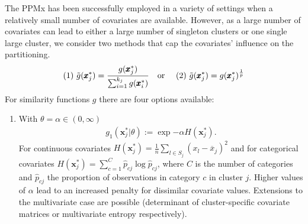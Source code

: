 \documentclass[12pt,a4paper]{article}
\begin{document}
The PPMx has been successfully employed in a variety
of settings when a relatively small number of covariates are
available.
However, as a large number of covariates can lead to either a large number of singleton clusters or one single large cluster, we consider two methods that cap the covariates' influence on the partitioning.
\begin{align*}
    (1) \ \Tilde{g} (\pmb{x}_j^*) = \frac{g (\pmb{x}_j^*)}{\sum_{i=1}^{k_j} g(\pmb{x}_i^*)} \ \text{\ \ or \ \ } \ (2) \ \Tilde{g} (\pmb{x}_j^*) = g (\pmb{x}_j^*)^{\frac{1}{p}}
\end{align*}
For similarity functions $g$ there are four options available:
\begin{enumerate}
 \item With $\theta = \alpha \in (0, \infty)$
    \begin{align*}
        g_1( \pmb{x}_j^* \vert \theta ) := \exp{- \alpha H (\pmb{x}_j^*) }.
    \end{align*}
    For continuous covariates $
    H(\pmb{x}_j^*)= \frac{1}{n} \sum_{l \in S_j} (x_l - \overline{x}_j)^2$ and for categorical covariates $H(\pmb{x}_j^*)= \sum_{c=1}^C \hat{p}_{cj} \log{\hat{p}_{cj}}$, where $C$ is the number of categories and $\hat{p}_{cj}$ the proportion of observations in category $c$ in cluster $j$.
    Higher values of $\alpha$ lead to an increased penalty for dissimilar covariate values. Extensions to the multivariate case are possible (determinant of cluster-specific covariate matrices or multivariate entropy respectively).


\end{enumerate}
\end{document}
